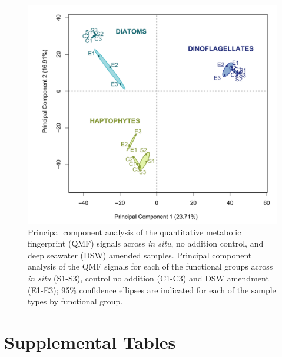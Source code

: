 
\begin{figure}[p!]
  \centering
    \includegraphics[width=1\textwidth]{Images/C4_FigureS7.pdf}
    \caption[Principal component analysis of the quantitative metabolic fingerprint (QMF) signals across \emph{in situ}, no addition control, and deep seawater amended samples]{Principal component analysis of the quantitative metabolic fingerprint (QMF) signals across \emph{in situ}, no addition control, and deep seawater (DSW) amended samples. Principal component analysis of the QMF signals for each of the functional groups across \emph{in situ} (S1-S3), control no addition (C1-C3) and DSW amendment (E1-E3); 95\% confidence ellipses are indicated for each of the sample types by functional group.}
  \label{fig:a4f7}
\end{figure}

\clearpage

\section{Supplemental Tables}

